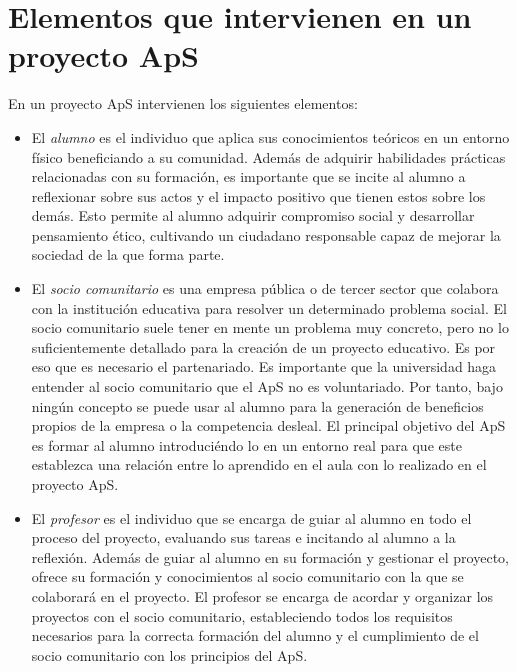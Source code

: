 \documentclass[11pt]{book}
\begin{document}
\section{Elementos que intervienen en un proyecto ApS}
En un proyecto ApS intervienen los siguientes elementos:
\begin{itemize} 
	\item El \emph{alumno} es el individuo que aplica sus conocimientos teóricos en un entorno físico beneficiando a su comunidad. Además de adquirir habilidades prácticas relacionadas con su formación, es importante que se incite al alumno a reflexionar sobre sus actos y el impacto positivo que tienen estos sobre los demás. Esto permite al alumno adquirir compromiso social y desarrollar pensamiento ético, cultivando un ciudadano responsable capaz de mejorar la sociedad de la que forma parte.
	
	\item El \emph{socio comunitario} es una empresa pública o de tercer sector que colabora con la institución educativa para resolver un determinado problema social. El socio comunitario suele tener en mente un problema muy concreto, pero no lo suficientemente detallado para la creación de un proyecto educativo. Es por eso que es necesario el partenariado. Es importante que la universidad haga entender al socio comunitario que el ApS no es voluntariado. Por tanto, bajo ningún concepto se puede usar al alumno para la generación de beneficios propios de la empresa o la competencia desleal. El principal objetivo del ApS es formar al alumno introduciéndo lo en un entorno real para que este establezca una relación entre lo aprendido en el aula con lo realizado en el proyecto ApS.
	
	\item El \emph{profesor} es el individuo que se encarga de guiar al alumno en todo el proceso del proyecto, evaluando sus tareas e incitando al alumno a la reflexión. Además de guiar al alumno en su formación y gestionar el proyecto, ofrece su formación y conocimientos al socio comunitario con la que se colaborará en el proyecto. El profesor se encarga de acordar y organizar los proyectos con el socio comunitario, estableciendo todos los requisitos necesarios para la correcta formación del alumno y el cumplimiento de el socio comunitario con los principios del ApS.
	

\end{itemize}
\end{document}

